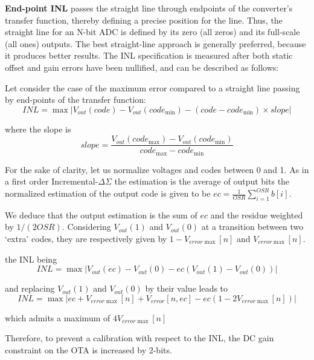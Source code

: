 \textbf{End-point INL} passes the straight line through endpoints of the converter's transfer function, thereby defining a precise position for the line. Thus, the straight line for an N-bit ADC is defined by its zero (all zeros) and its full-scale (all ones) outputs.
The best straight-line approach is generally preferred, because it produces better results. The INL specification is measured after both static offset and gain errors have been nullified, and can be described as follows:

Let consider the case of the maximum error compared to a straight line passing by end-points of the transfer function:
\begin{equation}
    INL = \max \left| V_{out}(code)-V_{out}(code_{\min}) - (code-code_{\min}) \times slope  \right|
\end{equation}

where the slope is 
\begin{equation}
    slope = \frac{V_{out}(code_{\max})-V_{out}(code_{\min})}{code_{\max}-code_{\min}}
\end{equation}

For the sake of clarity, let us normalize voltages and codes between 0 and 1. As in a first order Incremental-\(\Delta\Sigma \) the estimation is the average of output bits the normalized estimation of the output code is given to be \(ec = \frac{1}{OSR}\sum_{i=1}^{OSR} b[i] \). 

We deduce that the output estimation is the sum of $ec$ and the residue weighted by \(1/(2 OSR)\).  Considering \(V_{out}(1) \) and \(V_{out}(0) \) at a transition between two `extra' codes, they are respectively given by \(1-V_{error\max}[n] \) and \(V_{error\max}[n] \).

the INL being
\begin{equation}
    INL = \max \left| V_{out}(ec)-V_{out}(0) - ec (V_{out}(1)-V_{out}(0))  \right|
\end{equation}

and replacing \(V_{out}(1) \) and \(V_{out}(0)\) by their value leads to
\begin{equation}
    INL = \max \left| ec + V_{error\max } [n] + V_{error}[n, ec] - ec (1 - 2 V_{error\max }[n])  \right|
\end{equation}

which admits a maximum of \(4 V_{error\max }[n] \)

Therefore, to prevent a calibration with respect to the INL, the DC gain constraint on the OTA is increased by 2-bits.
